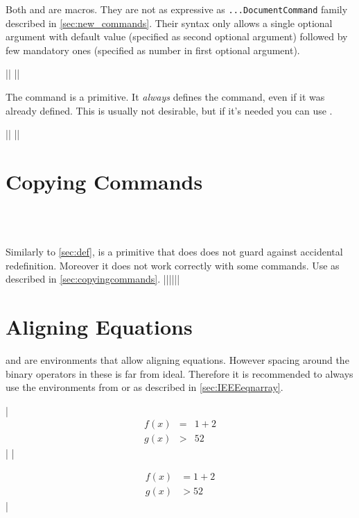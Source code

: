 Both  and  are  macros. They
are not as expressive as \texttt{...DocumentCommand} family  %
described in \autoref{sec:new_commands}. Their syntax only allows a single
optional argument with default value (specified as second optional argument)
followed by few mandatory ones (specified as number in first optional
argument).
\begin{chktexignore}
  \vchto|\newcommand{\foo}[4][bar]{ ... }|
  ||
\end{chktexignore}

The  command is a  primitive. It \emph{always} defines
the command, even if it was already defined. This is usually not desirable, but
if it's needed you can use .
\begin{chktexignore}
  \vchto|\def\foo#1#2#3{ ... }|
  ||
\end{chktexignore}

\section{Copying Commands}
 {
   \\
   \\
}

Similarly to \autoref{sec:def},  is a  primitive that does
does not guard against accidental redefinition. Moreover it does not work
correctly with some  commands. Use  as
described in \autoref{sec:copyingcommands}.
\chto|\let\foo\bar||\NewCommandCopy\foo\bar|

\section{Aligning Equations}

 and  are  environments that allow
aligning equations. However spacing around the binary operators in these is far
from ideal. Therefore it is recommended to always use the  environments
from  or  as described in
\autoref{sec:IEEEeqnarray}.
\begin{chktexignore}
\chto
|\begin{eqnarray}
  f(x) & = &  1 + 2 \\
  g(x) & > & 52
\end{eqnarray}|
|\usepackage{amsmath}
\begin{align}
  f(x) & = 1 + 2 \\
  g(x) & > 52
\end{align}|
\end{chktexignore}

